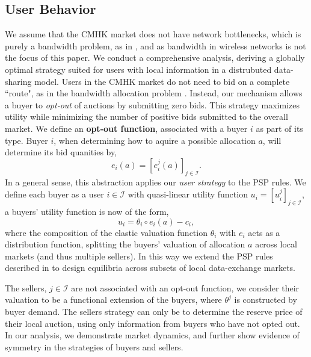 \documentclass[12pt]{article}
\theoremstyle{definition}
\newcommand{\mcI}{\mathcal{I}}
\begin{document}
\begin{multicols}{2}
\subsection{User Behavior}

We assume that the CMHK market does not have network
bottlenecks, which is purely a bandwidth problem, as in \cite{semret}, and as
bandwidth in wireless networks is not the focus of this paper. We
conduct a comprehensive analysis, deriving a globally optimal strategy suited for
users with local information in a distrubuted data-sharing model. 
Users in the CMHK market do not need to bid on a complete ``route", as in the
bandwidth allocation problem \cite{semret}. Instead, our mechanism allows a buyer
to \emph{opt-out} of auctions by submitting zero bids. This strategy maximizes
utility while minimizing the number of positive bids submitted to the overall
market. We define an \textbf{opt-out function}, associated with a buyer $i$ as
part of its type. Buyer $i$, when determining how to aquire a possible allocation $a$,
will determine its bid quanities by,
\begin{equation}\label{opt-out}
    e_i(a) = [e_i^j(a)]_{j\in\mcI}.
\end{equation}
In a general sense, this abstraction applies our \emph{user strategy}
to the PSP rules.
We define each buyer as a user $i\in\mcI$ with quasi-linear utility
function $u_i = [u_i^j]_{j\in\mcI}$, a buyers' utility function is now of the form,
\begin{equation}\label{buyerutility}
    u_i = \theta_i \circ e_i(a) - c_i,
\end{equation}
where the composition of the elastic valuation function $\theta_i$ with $e_i$ acts as a distribution function, splitting
the buyers' valuation of allocation $a$ across local markets (and thus multiple sellers).
In this way we extend the PSP rules described
in \cite{semret} to design equilibria across subsets of local data-exchange markets.

The sellers, $j\in\mcI$ are not associated with an opt-out function, we
consider their valuation to be a functional extension of the buyers, where
$\theta^j$ is constructed by buyer demand.
The sellers strategy can only be to determine the reserve price of their local
auction, using only information from buyers who have not opted out.
In our analysis, we demonstrate market dynamics, and further show evidence of symmetry in the strategies of
buyers and sellers.


\end{multicols}
\end{document}
